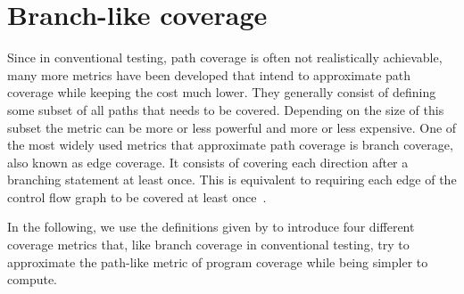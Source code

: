 

\begin{comment}
    - Analogous to the conventional path-like coverage I define program coverage    \/
    
    - Definition + example      \/
    
    - show that total program coverage means all possible answer sets get produced by the testsuite
    
    - talk about the problems here? (complexity + not possible for programs with variables as it is necessary to enumerate all 
    possible inputs to find maximum coverage)
\end{comment}

\section{Branch-like coverage}
\label{sec:Coverage metrics/Branch-like coverage}
Since in conventional testing, path coverage is often not realistically achievable, many more metrics have been developed that intend to approximate path coverage while keeping the cost much lower. They generally consist of defining some subset of all paths that needs to be covered. Depending on the size of this subset the metric can be more or less powerful and more or less expensive. One of the most widely used metrics that approximate path coverage is branch coverage, also known as edge coverage. It consists of covering each direction after a branching statement at least once. This is equivalent to requiring each edge of the control flow graph to be covered at least once~\cite[Chapter 7.2]{AO16}.

In the following, we use the definitions given by \cite{Jan+10} to introduce four different coverage metrics that, like branch coverage in conventional testing, try to approximate the path-like metric of program coverage while being simpler to compute.

\begin{comment}
    - general introduction to branch-like coverage in conventional programming languages (source)     \/
    
        - use the control flow graph and cover every possible branch through this graph   \/
    
    - less complete but easier to compute, still very potent(?) (source)    (\/)
    
    - there are different types of branch like coverage even in conventional programming languages (source), the same is true here      \/

    - maybe example for both branch and path coverage?? -> requires conventional program as example -> maybe not
\end{comment}

